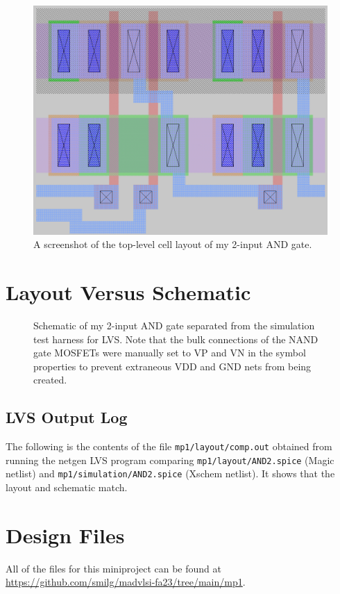 \documentclass{article}
\begin{document}
\begin{figure}[h]
    \centering
    \includegraphics[width=\columnwidth]{../images/magic-layout.png}
    \caption{A screenshot of the top-level cell layout of my 2-input AND gate.}\label{fig:layout}
\end{figure}
\pagebreak

\section{Layout Versus Schematic}

\begin{figure}[h]
    \centering
    
    \caption{Schematic of my 2-input AND gate separated from the simulation test harness for LVS. Note that the bulk connections of the NAND gate MOSFETs were manually set to VP and VN in the symbol properties to prevent extraneous VDD and GND nets from being created.}\label{fig:and_lvs_schem}
\end{figure}
\pagebreak

\subsection{LVS Output Log}

The following is the contents of the file \texttt{mp1/layout/comp.out} obtained from running the netgen LVS program comparing \texttt{mp1/layout/AND2.spice} (Magic netlist) and \texttt{mp1/simulation/AND2.spice} (Xschem netlist). It shows that the layout and schematic match.

\lstset{%
    breaklines=true,
    breakatwhitespace=true,
}


\section{Design Files}

All of the files for this miniproject can be found at \url{https://github.com/smilg/madvlsi-fa23/tree/main/mp1}.
\end{document}
